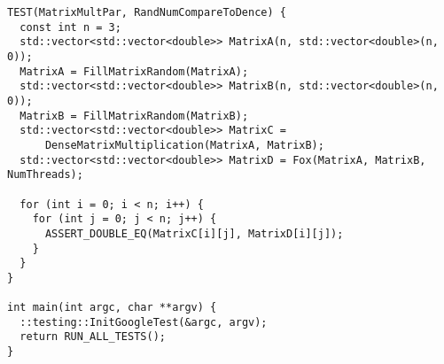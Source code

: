 \documentclass{report}
\begin{document}
\begin{lstlisting}
TEST(MatrixMultPar, RandNumCompareToDence) {
  const int n = 3;
  std::vector<std::vector<double>> MatrixA(n, std::vector<double>(n, 0));
  MatrixA = FillMatrixRandom(MatrixA);
  std::vector<std::vector<double>> MatrixB(n, std::vector<double>(n, 0));
  MatrixB = FillMatrixRandom(MatrixB);
  std::vector<std::vector<double>> MatrixC =
      DenseMatrixMultiplication(MatrixA, MatrixB);
  std::vector<std::vector<double>> MatrixD = Fox(MatrixA, MatrixB, NumThreads);

  for (int i = 0; i < n; i++) {
    for (int j = 0; j < n; j++) {
      ASSERT_DOUBLE_EQ(MatrixC[i][j], MatrixD[i][j]);
    }
  }
}

int main(int argc, char **argv) {
  ::testing::InitGoogleTest(&argc, argv);
  return RUN_ALL_TESTS();
}
 \end{lstlisting}
 
\end{document}
